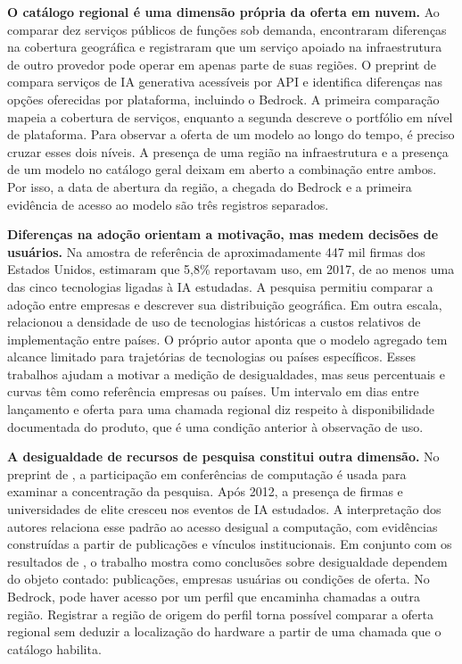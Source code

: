 \documentclass[12pt,a4paper]{article}
\begin{document}
\textbf{O catálogo regional é uma dimensão própria da oferta em nuvem.}
Ao comparar dez serviços públicos de funções sob demanda, \citet[seções II e III-E]{ekwe2024} encontraram diferenças na cobertura geográfica e registraram que um serviço apoiado na infraestrutura de outro provedor pode operar em apenas parte de suas regiões. O preprint de \citet[seção 4.6, tabela 11]{patel2024} compara serviços de IA generativa acessíveis por API e identifica diferenças nas opções oferecidas por plataforma, incluindo o Bedrock. A primeira comparação mapeia a cobertura de serviços, enquanto a segunda descreve o portfólio em nível de plataforma. Para observar a oferta de um modelo ao longo do tempo, é preciso cruzar esses dois níveis. A presença de uma região na infraestrutura e a presença de um modelo no catálogo geral deixam em aberto a combinação entre ambos. Por isso, a data de abertura da região, a chegada do Bedrock e a primeira evidência de acesso ao modelo são três registros separados.

\textbf{Diferenças na adoção orientam a motivação, mas medem decisões de usuários.}
Na amostra de referência de aproximadamente 447 mil firmas dos Estados Unidos, \citet[seções 3.1 e 3.3]{mcelheran2024} estimaram que 5,8\% reportavam uso, em 2017, de ao menos uma das cinco tecnologias ligadas à IA estudadas. A pesquisa permitiu comparar a adoção entre empresas e descrever sua distribuição geográfica. Em outra escala, \citet[seções 4 e 5]{knez2023} relacionou a densidade de uso de tecnologias históricas a custos relativos de implementação entre países. O próprio autor aponta que o modelo agregado tem alcance limitado para trajetórias de tecnologias ou países específicos. Esses trabalhos ajudam a motivar a medição de desigualdades, mas seus percentuais e curvas têm como referência empresas ou países. Um intervalo em dias entre lançamento e oferta para uma chamada regional diz respeito à disponibilidade documentada do produto, que é uma condição anterior à observação de uso.

\clearpage
\textbf{A desigualdade de recursos de pesquisa constitui outra dimensão.}
No preprint de \citet[resumo e seção \emph{Limitations}]{ahmed2020}, a participação em conferências de computação é usada para examinar a concentração da pesquisa. Após 2012, a presença de firmas e universidades de elite cresceu nos eventos de IA estudados. A interpretação dos autores relaciona esse padrão ao acesso desigual a computação, com evidências construídas a partir de publicações e vínculos institucionais. Em conjunto com os resultados de \citet{mcelheran2024}, o trabalho mostra como conclusões sobre desigualdade dependem do objeto contado: publicações, empresas usuárias ou condições de oferta. No Bedrock, pode haver acesso por um perfil que encaminha chamadas a outra região. Registrar a região de origem do perfil torna possível comparar a oferta regional sem deduzir a localização do hardware a partir de uma chamada que o catálogo habilita.
\end{document}
